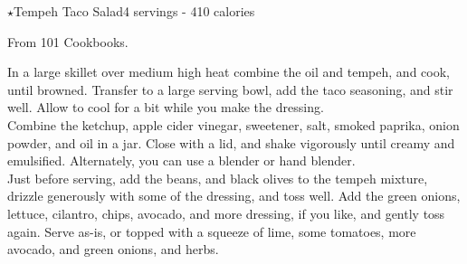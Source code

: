 \begin{recipe}{\texorpdfstring{$\star$}{str}Tempeh Taco Salad}{4 servings - 410 calories}{}

\freeform From 101 Cookbooks.


In a large skillet over medium high heat combine the oil and tempeh, and cook, until browned. Transfer to a large serving bowl, add the taco seasoning, and stir well. Allow to cool for a bit while you make the dressing.\\

Combine the ketchup, apple cider vinegar, sweetener, salt, smoked paprika, onion powder, and oil in a jar. Close with a lid, and shake vigorously until creamy and emulsified. Alternately, you can use a blender or hand blender.\\

Just before serving, add the beans, and black olives to the tempeh mixture, drizzle generously with some of the dressing, and toss well. Add the green onions, lettuce, cilantro, chips, avocado, and more dressing, if you like, and gently toss again. Serve as-is, or topped with a squeeze of lime, some tomatoes, more avocado, and green onions, and herbs.

\end{recipe}